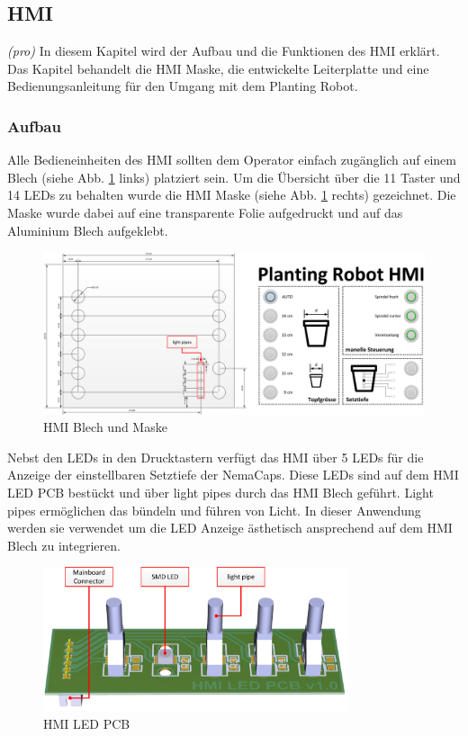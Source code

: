 \subsection{HMI} \label{sec:HMI}
\textit{(pro)} In diesem Kapitel wird der Aufbau und die Funktionen des HMI erklärt. Das Kapitel behandelt die HMI Maske, die entwickelte Leiterplatte und eine Bedienungsanleitung für den Umgang mit dem Planting Robot.

\subsubsection{Aufbau}
Alle Bedieneinheiten des HMI sollten dem Operator einfach zugänglich auf einem Blech (siehe Abb. \ref{fig:HMI_Maske} links) platziert sein. Um die Übersicht über die 11 Taster und 14 LEDs zu behalten wurde die HMI Maske (siehe Abb. \ref{fig:HMI_Maske} rechts) gezeichnet. Die Maske wurde dabei auf eine transparente Folie aufgedruckt und auf das Aluminium Blech aufgeklebt.

\begin{figure}[H]
	\includegraphics[width=1\textwidth]{Illustrationen/6-Umsetzung/HMI_Maske_Blech.png}
	\caption{HMI Blech und Maske}
	\label{fig:HMI_Maske}
\end{figure}

Nebst den LEDs in den Drucktastern verfügt das HMI über 5 LEDs für die Anzeige der einstellbaren Setztiefe der NemaCaps. Diese LEDs sind auf dem HMI LED PCB bestückt und über light pipes durch das HMI Blech geführt. Light pipes ermöglichen das bündeln und führen von Licht. In dieser Anwendung werden sie verwendet um die LED Anzeige ästhetisch ansprechend auf dem HMI Blech zu integrieren.

\begin{figure}[H]
	\includegraphics[width=0.8\textwidth]{Illustrationen/6-Umsetzung/LED_PCB_3D.jpg}
	\caption{HMI LED PCB}
	\label{fig:LED_PCB_1}
\end{figure}

